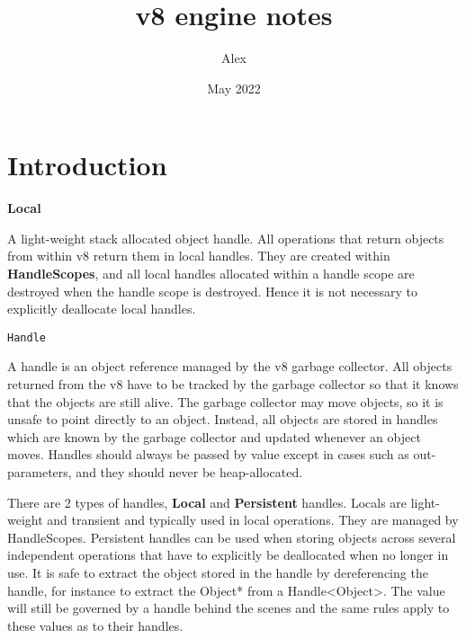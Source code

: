 \documentclass{article}
\title{v8 engine notes}
\author{Alex }
\date{May 2022}
\begin{document}
\maketitle

\section{Introduction}

\textbf{Local}

A light-weight stack allocated object handle. All operations that return objects from within v8 return them in local handles. They are created within \textbf{HandleScopes}, and all local handles allocated within a handle scope are destroyed when the handle scope is destroyed. Hence it is not necessary to explicitly deallocate local handles. 

\texttt{Handle}

A handle is an object reference managed by the v8 garbage collector. All objects returned from the v8 have to be tracked by the garbage collector so that it knows that the objects are still alive. The garbage collector may move objects, so it is unsafe to point directly to an object. Instead, all objects are stored in handles which are known by the garbage collector and updated whenever an object moves. Handles should always be passed by value except in cases such as out-parameters, and they should never be heap-allocated. 

There are 2 types of handles, \textbf{Local} and \textbf{Persistent} handles. Locals are light-weight and transient and typically used in local operations. They are managed by HandleScopes. Persistent handles can be used when storing objects across several independent operations that have to explicitly be deallocated when no longer in use. It is safe to extract the object stored in the handle by dereferencing the handle, for instance to extract the Object* from a Handle<Object>. The value will still be governed by a handle behind the scenes and the same rules apply to these values as to their handles. 
\end{document}
